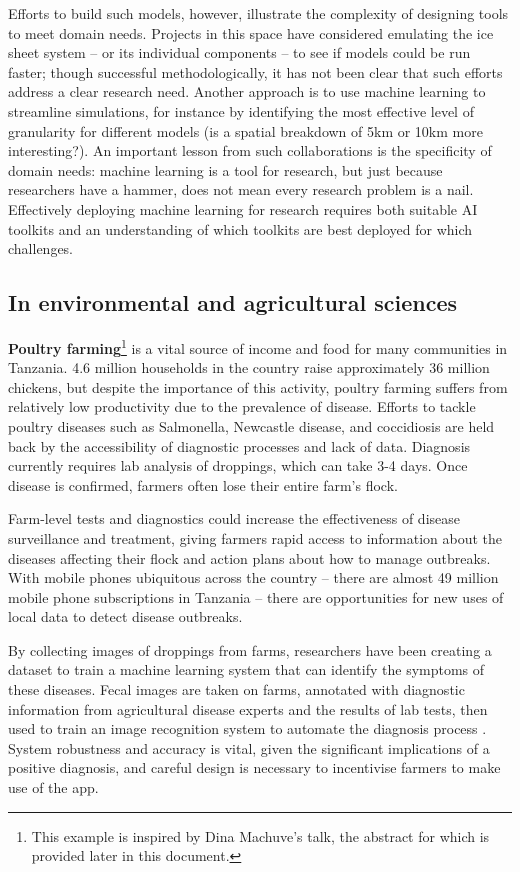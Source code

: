 Efforts to build such models, however, illustrate the complexity of
designing tools to meet domain needs. Projects in this space have
considered emulating the ice sheet system -- or its individual
components -- to see if models could be run faster; though successful
methodologically, it has not been clear that such efforts address a
clear research need. Another approach is to use machine learning to
streamline simulations, for instance by identifying the most effective
level of granularity for different models (is a spatial breakdown of 5km
or 10km more interesting?). An important lesson from such collaborations
is the specificity of domain needs: machine learning is a tool for
research, but just because researchers have a hammer, does not mean
every research problem is a nail. Effectively deploying machine learning
for research requires both suitable AI toolkits and an understanding of
which toolkits are best deployed for which challenges.

\subsection{In environmental and agricultural
sciences}\label{in-environmental-and-agricultural-sciences}

\textbf{Poultry farming}\footnote{This example is inspired by Dina
  Machuve's talk, the abstract for which is provided later in this
  document.} is a vital source of income and food for many communities
in Tanzania. 4.6 million households in the country raise approximately
36 million chickens, but despite the importance of this activity,
poultry farming suffers from relatively low productivity due to the
prevalence of disease. Efforts to tackle poultry diseases such as
Salmonella, Newcastle disease, and coccidiosis are held back by the
accessibility of diagnostic processes and lack of data. Diagnosis
currently requires lab analysis of droppings, which can take 3-4 days.
Once disease is confirmed, farmers often lose their entire farm's flock.

Farm-level tests and diagnostics could increase the effectiveness of
disease surveillance and treatment, giving farmers rapid access to
information about the diseases affecting their flock and action plans
about how to manage outbreaks. With mobile phones ubiquitous across the
country -- there are almost 49 million mobile phone subscriptions in
Tanzania -- there are opportunities for new uses of local data to detect
disease outbreaks.

By collecting images of droppings from farms, researchers have been
creating a dataset to train a machine learning system that can
identify the symptoms of these diseases. Fecal images are taken on
farms, annotated with diagnostic information from agricultural disease
experts and the results of lab tests, then used to train an image
recognition system to automate the diagnosis process
\citep{Machuve-poultry22}. System robustness and accuracy is vital,
given the significant implications of a positive diagnosis, and
careful design is necessary to incentivise farmers to make use of the
app.

